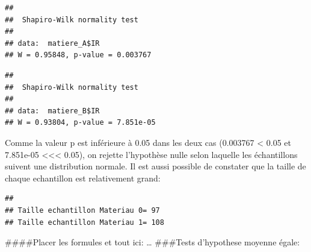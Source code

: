 \documentclass[
]{article}
\newenvironment{Shaded}{\begin{snugshade}}{\end{snugshade}}
\newcommand{\DocumentationTok}[1]{\textcolor[rgb]{0.56,0.35,0.01}{\textbf{\textit{#1}}}}
\newcommand{\FunctionTok}[1]{\textcolor[rgb]{0.13,0.29,0.53}{\textbf{#1}}}
\newcommand{\NormalTok}[1]{#1}
\newcommand{\OtherTok}[1]{\textcolor[rgb]{0.56,0.35,0.01}{#1}}
\newcommand{\SpecialCharTok}[1]{\textcolor[rgb]{0.81,0.36,0.00}{\textbf{#1}}}
\newcommand{\StringTok}[1]{\textcolor[rgb]{0.31,0.60,0.02}{#1}}
\begin{document}
\begin{verbatim}
## 
##  Shapiro-Wilk normality test
## 
## data:  matiere_A$IR
## W = 0.95848, p-value = 0.003767
\end{verbatim}

\begin{Shaded}
\end{Shaded}

\begin{verbatim}
## 
##  Shapiro-Wilk normality test
## 
## data:  matiere_B$IR
## W = 0.93804, p-value = 7.851e-05
\end{verbatim}

Comme la valeur p est inférieure à 0.05 dans les deux cas (0.003767
\textless{} 0.05 et 7.851e-05 \textless\textless\textless{} 0.05), on
rejette l'hypothèse nulle selon laquelle les échantillons suivent une
distribution normale. Il est aussi possible de constater que la taille
de chaque echantillon est relativement grand:

\begin{Shaded}
\end{Shaded}

\begin{verbatim}
## 
## Taille echantillon Materiau 0= 97 
## Taille echantillon Materiau 1= 108
\end{verbatim}

\#\#\#\#Placer les formules et tout ici: \ldots{} \#\#\#Tests
d'hypothese moyenne égale:
\end{document}
